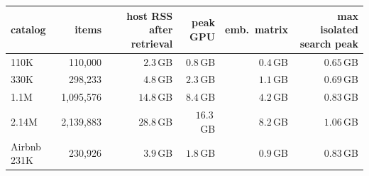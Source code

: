 \begin{tabular}{lrrrrr}
\toprule
catalog & items & host RSS after retrieval & peak GPU & emb.\ matrix & max isolated search peak \\
\midrule
110K & 110,000 & $2.3$\,GB & $0.8$\,GB & $0.4$\,GB & $0.65$\,GB \\
330K & 298,233 & $4.8$\,GB & $2.3$\,GB & $1.1$\,GB & $0.69$\,GB \\
1.1M & 1,095,576 & $14.8$\,GB & $8.4$\,GB & $4.2$\,GB & $0.83$\,GB \\
2.14M & 2,139,883 & $28.8$\,GB & $16.3$\,GB & $8.2$\,GB & $1.06$\,GB \\
Airbnb 231K & 230,926 & $3.9$\,GB & $1.8$\,GB & $0.9$\,GB & $0.83$\,GB \\
\bottomrule
\end{tabular}

